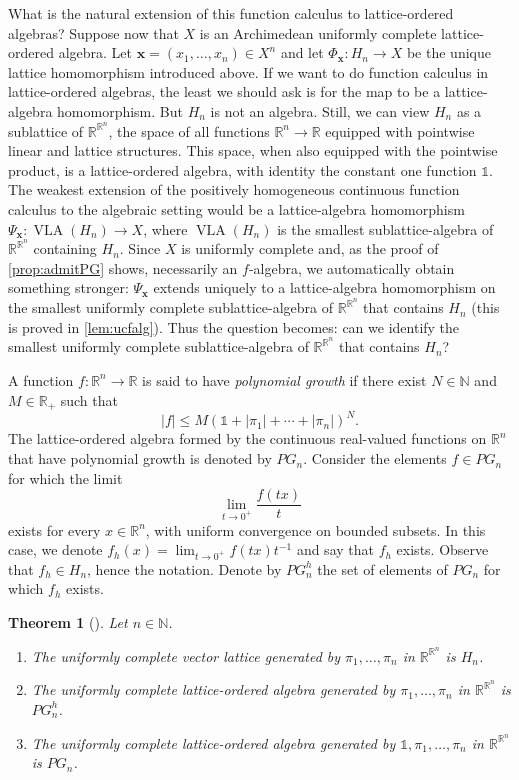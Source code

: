 \documentclass{amsart}
\theoremstyle{plain}
\newtheorem{thm}{Theorem}[section]
\theoremstyle{definition}
\theoremstyle{remark}
\newcommand\N{\ensuremath{\mathbb{N}}}
\newcommand\R{\ensuremath{\mathbb{R}}}
\newcommand{\one}{\mathbb{1}}
\newcommand{\falg}{$f\!$-algebra}
\newcommand{\VLA}{\operatorname{VLA}}
\newcommand{\Phx}{\Phi_{\bm x}}
\newcommand{\Psx}{\Psi_{\bm x}}
\begin{document}
What is the natural extension of this function calculus to
lattice-ordered algebras? Suppose now that $X$ is an
Archimedean uniformly complete lattice-ordered algebra.
Let $\bm x=(x_1,\ldots ,x_n) \in X^{n}$ and let $\Phx\colon H_n\to X$
be the unique lattice homomorphism introduced above. If we want to do
function calculus in lattice-ordered algebras, the least we should ask
is for the map to be a lattice-algebra homomorphism. But $H_n$ is not an
algebra. Still, we can view $H_n$ as a sublattice of $\R^{\R^{n}}$, the
space of all functions $\R^{n}\to \R$ equipped with pointwise linear
and lattice structures. This space, when also equipped with the pointwise
product, is a lattice-ordered algebra, with identity the constant one
function $\one$. The weakest extension of the positively homogeneous continuous
function calculus to the algebraic setting would be a
lattice-algebra homomorphism $\Psx\colon \VLA(H_n)\to X$, where
$\VLA(H_n)$ is the smallest sublattice-algebra of $\R^{\R^{n}}$
containing $H_n$.
Since $X$ is uniformly complete and, as the proof of
\cref{prop:admitPG} shows, necessarily an \falg, we automatically
obtain something stronger:
$\Psx$ extends uniquely to a lattice-algebra homomorphism
on the smallest uniformly complete sublattice-algebra of $\R^{\R^{n}}$
that contains $H_n$ (this is proved in \cref{lem:ucfalg}). Thus the
question becomes: can we identify the smallest uniformly complete
sublattice-algebra of $\R^{\R^{n}}$ that contains $H_n$?

A function $f\colon \R^{n}\to
\R$ is said to have \emph{polynomial growth} if there exist $N \in \N$ and $M \in \R_+$ such that
\[
    |f|\le M(\one+|\pi _1|+ \cdots +|\pi _n|)^{N}.
\]
The lattice-ordered algebra formed by the continuous real-valued
functions on $\R^{n}$ that have polynomial growth is denoted by $PG_n$. Consider the elements $f \in PG_n$ for
which the limit
\[
\lim_{t\to 0^{+}}\frac{f(tx)}{t}
\]
exists for every $x \in \R^{n}$, with uniform convergence on
bounded subsets.
In this case, we denote $f_h(x)=\lim_{t\to
0^{+}}f(tx)t^{-1}$ and say that $f_h$ exists. Observe that $f_h \in H_n$,
hence the notation. Denote by $PG_n^{h}$ the set of elements of $PG_n$
for which $f_h$ exists.

\begin{thm}[{\cite[Propositions 3.6 and
    4.9]{buskes_depagter_vanrooij1991}}]\label{thm:ucgenerated}
    Let $n \in \N$.
    \begin{enumerate}
        \item The uniformly complete vector lattice generated by $\pi
            _1,\ldots ,\pi _n$ in $\R^{\R^{n}}$ is $H_n$.
        \item The uniformly complete lattice-ordered algebra generated
            by $\pi _1,\ldots ,\pi _n$ in $\R^{\R^{n}}$ is $PG_n^{h}$.
        \item The uniformly complete lattice-ordered algebra generated
            by $\one,\pi _1,\ldots ,\pi _n$ in $\R^{\R^{n}}$ is $PG_n$.
    \end{enumerate}
\end{thm}
\end{document}
